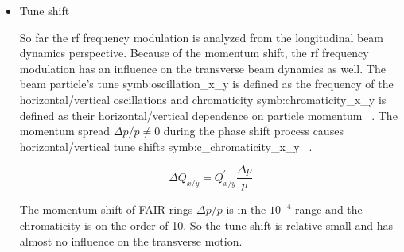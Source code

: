 \begin{itemize}
	\item Tune shift

So far the rf frequency modulation is analyzed from the longitudinal beam dynamics perspective. Because of the momentum shift, the rf frequency modulation has an influence on the transverse beam dynamics as well. The beam particle's tune \gls{symb:oscillation_x_y} is defined as the frequency of the horizontal/vertical oscillations and chromaticity \gls{symb:chromaticity_x_y} is defined as their horizontal/vertical dependence on particle momentum ~\cite{steinhagen_tune_2008}. The momentum spread ${\Delta{p}}/{p} \neq 0$ during the phase shift process causes horizontal/vertical tune shifts \gls{symb:c_chromaticity_x_y} ~\cite{holzer_introduction_2013}.

\begin{equation}
\Delta{Q_{\mathit{x/y}}} = Q^\prime_{\mathit{x/y}}\frac{\Delta{p}}{p}
\label{eq:chromaticity_x}
\end{equation} 

The momentum shift of FAIR rings $\Delta p/p$ is in the $10^{-4}$ range and the chromaticity is on the order of \SI{10}{}. So the tune shift is relative small and has almost no influence on the transverse motion.

\end{itemize}

